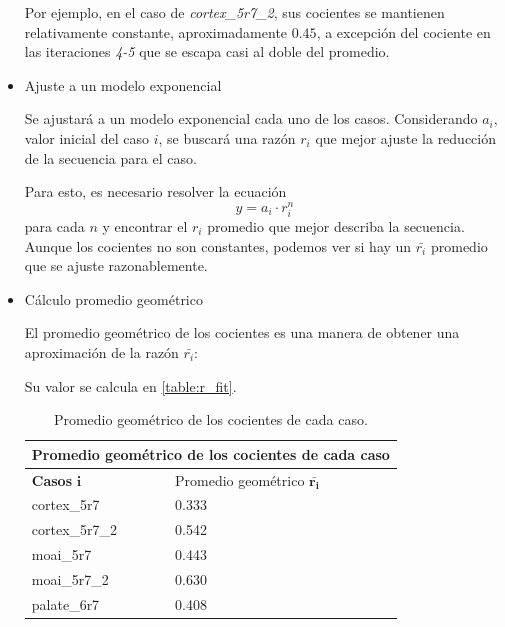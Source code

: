 \begin{itemize}
	Por ejemplo, en el caso de \textit{cortex\_5r7\_2}, sus cocientes se mantienen relativamente constante, aproximadamente $0.45$, a excepción del cociente en las iteraciones \textit{4-5} que se escapa casi al doble del promedio.


    \item Ajuste a un modelo exponencial

	Se ajustará a un modelo exponencial cada uno de los casos. Considerando $a_i$, valor inicial del caso $i$, se buscará una razón $r_i$ que mejor ajuste la reducción de la secuencia para el caso.
    
    Para esto, es necesario resolver la ecuación $$y = a_i \cdot r_{i}^{n}$$ para cada $n$ y encontrar el $r_i$ promedio que mejor describa la secuencia. Aunque los cocientes no son constantes, podemos ver si hay un $\bar{r_i}$ promedio que se ajuste razonablemente.

    \item Cálculo promedio geométrico

    El promedio geométrico de los cocientes es una manera de obtener una aproximación de la razón $\bar{r_i}$:

    Su valor se calcula en \autoref{table:r_fit}.

	\begin{table}[!ht]
 		\centering
		\begin{tabular}{|ll|}
		\hline
		\multicolumn{2}{|c|}{Promedio geométrico de los cocientes de cada caso}     \\ \hline
		\multicolumn{1}{|l|}{\textbf{Casos} $\mathbf{i}$}     & Promedio geométrico $\mathbf{\bar{r_i}}$ \\ \hline
		\multicolumn{1}{|l|}{cortex\_5r7}    & 0.333                                \\ \hline
		\multicolumn{1}{|l|}{cortex\_5r7\_2} & 0.542                                \\ \hline
		\multicolumn{1}{|l|}{moai\_5r7}      & 0.443                                \\ \hline
		\multicolumn{1}{|l|}{moai\_5r7\_2}   & 0.630                                \\ \hline
		\multicolumn{1}{|l|}{palate\_6r7}    & 0.408                                \\ \hline
		\end{tabular}
		\caption{Promedio geométrico de los cocientes de cada caso. }
		\label{table:r_fit}
	\end{table}


\end{itemize}
